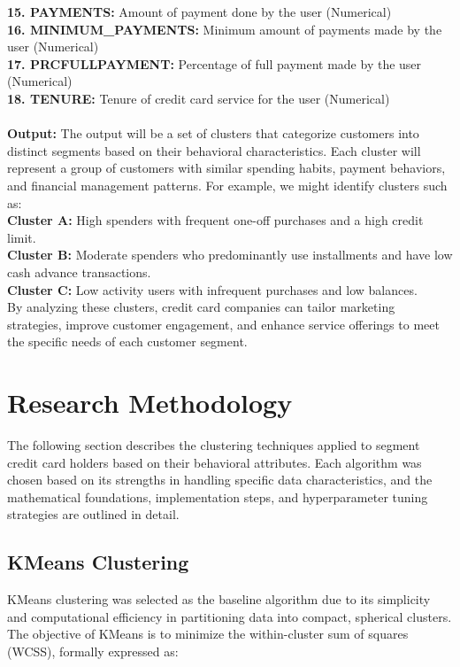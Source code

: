 \documentclass[runningheads,a4paper]{llncs}
\begin{document}
\textbf{15. PAYMENTS:} Amount of payment done by the user (Numerical) \\
\textbf{16. MINIMUM\_PAYMENTS:} Minimum amount of payments made by the user (Numerical) \\
\textbf{17. PRCFULLPAYMENT:} Percentage of full payment made by the user (Numerical) \\
\textbf{18. TENURE:} Tenure of credit card service for the user (Numerical) \\
\\
\textbf{Output:} The output will be a set of clusters that categorize customers into distinct segments based on their behavioral characteristics. Each cluster will represent a group of customers with similar spending habits, payment behaviors, and financial management patterns. For example, we might identify clusters such as: 
\\
\textbf{Cluster A:} High spenders with frequent one-off purchases and a high credit limit. \\
\textbf{Cluster B:} Moderate spenders who predominantly use installments and have low cash advance transactions. \\
\textbf{Cluster C:} Low activity users with infrequent purchases and low balances. \\

By analyzing these clusters, credit card companies can tailor marketing strategies, improve customer engagement, and enhance service offerings to meet the specific needs of each customer segment.

\section{Research Methodology}

The following section describes the clustering techniques applied to segment credit card holders based on their behavioral attributes. Each algorithm was chosen based on its strengths in handling specific data characteristics, and the mathematical foundations, implementation steps, and hyperparameter tuning strategies are outlined in detail.

\subsection{KMeans Clustering}

KMeans clustering was selected as the baseline algorithm due to its simplicity and computational efficiency in partitioning data into compact, spherical clusters. The objective of KMeans is to minimize the within-cluster sum of squares (WCSS), formally expressed as:
\end{document}
